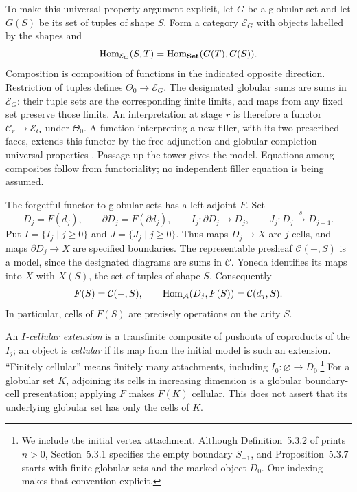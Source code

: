 To make this universal-property argument explicit, let $G$ be a globular
set and let $G(S)$ be its set of tuples of shape $S$.  Form a category
$\mathcal E_G$ with objects labelled by the shapes and
\[
 \operatorname{Hom}_{\mathcal E_G}(S,T)=\operatorname{Hom}_{\mathbf{Set}}(G(T),G(S)).
\]
Composition is composition of functions in the indicated opposite
direction.  Restriction of tuples defines $\Theta_0\to\mathcal E_G$.
The designated globular sums are sums in $\mathcal E_G$: their tuple
sets are the corresponding finite limits, and maps from any fixed set
preserve those limits.  An interpretation at stage $r$ is therefore a
functor $\mathcal C_r\to\mathcal E_G$ under $\Theta_0$.  A function
interpreting a new filler, with its two prescribed faces, extends this
functor by the free-adjunction and globular-completion universal
properties \cite[Section~2.9]{Ara2013}.  Passage up the tower gives
the model.  Equations among composites follow from functoriality;
no independent filler equation is being assumed.

The forgetful functor to globular sets has a left adjoint $F$.  Set
\[
 D_j=F(d_j),\qquad \partial D_j=F(\partial d_j),\qquad
 I_j:\partial D_j\longrightarrow D_j,\qquad
 J_j:D_j\xrightarrow{s}D_{j+1}.
\]
Put $I=\{I_j\mid j\ge0\}$ and $J=\{J_j\mid j\ge0\}$.
Thus maps $D_j\to X$ are $j$-cells, and maps $\partial D_j\to X$ are
specified boundaries.  The representable presheaf $\mathcal C(-,S)$ is
a model, since the designated diagrams are sums in $\mathcal C$.
Yoneda identifies its maps into $X$ with $X(S)$, the set of tuples of
shape $S$.  Consequently
\begin{equation}\label{eq:prelim-free-shape}
 F(S)=\mathcal C(-,S),\qquad
 \operatorname{Hom}_{\mathcal A}(D_j,F(S))=\mathcal C(d_j,S).
\end{equation}
In particular, cells of $F(S)$ are precisely operations on the arity $S$.

An \emph{$I$-cellular extension} is a transfinite composite of pushouts
of coproducts of the $I_j$; an object is \emph{cellular} if its map from
the initial model is such an extension.  ``Finitely cellular'' means
finitely many attachments, including $I_0:\varnothing\to D_0$.\footnote{We
include the initial vertex attachment.  Although Definition~5.3.2 of
\cite{Henry2016} prints $n>0$, Section~5.3.1 specifies the empty boundary
$S_{-1}$, and Proposition~5.3.7 starts with finite globular sets and the
marked object $D_0$.  Our indexing makes that convention explicit.}
For a globular set $K$, adjoining its cells in increasing dimension is
a globular boundary-cell presentation; applying $F$ makes $F(K)$
cellular.  This does not assert that its underlying globular set has
only the cells of $K$.

